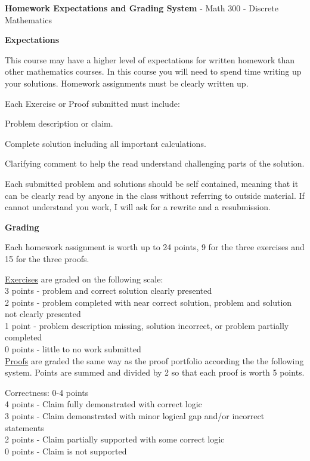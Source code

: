 \documentclass[10pt]{article}
\newenvironment{packed_enum}{
\begin{enumerate}
  \setlength{\itemsep}{1pt}
  \setlength{\parskip}{0pt}
  \setlength{\parsep}{0pt}
}{\end{enumerate}}
\begin{document}
\pagestyle{empty}

\begin{center}
{\bf Homework Expectations and  Grading System} - Math 300 - Discrete Mathematics %
\end{center}

{\bf Expectations}

This course may have a higher level of expectations for written homework than other mathematics courses.  In this course you will need to spend time writing up your solutions.  Homework assignments must be clearly written up.

Each Exercise or Proof submitted must include:
\begin{packed_enum}
\item Problem description or claim.
\item Complete solution including all important calculations.
\item Clarifying comment to help the read understand challenging parts of the solution.
\end{packed_enum}

Each submitted problem and solutions should be self contained, meaning that it can be clearly read by anyone in the class without referring to outside material. If cannot understand you work, I will ask for a rewrite and a resubmission.

{\bf Grading}

Each homework assignment is worth up to 24 points, 9 for the three exercises and 15 for the three proofs.

\underline{Exercises} are graded on the following scale:\\
3 points - problem and correct solution clearly presented\\
2 points - problem completed with near correct solution, problem and solution not clearly presented\\
1 point - problem description missing, solution incorrect, or problem partially completed\\
0 points - little to no work submitted\\

\underline{Proofs} are graded the same way as the proof portfolio according the the following system.  Points are summed and divided by 2 so that each proof is worth 5 points.

Correctness: 0-4 points\\
4 points - Claim fully demonstrated with correct logic\\
3 points - Claim demonstrated with minor logical gap and/or incorrect statements\\
2 points - Claim partially supported with some correct logic \\
0 points - Claim is not supported\\
\end{document}
